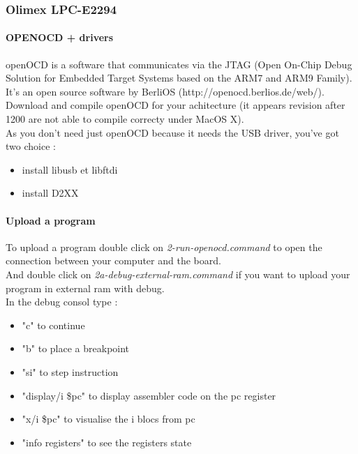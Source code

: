 
\subsubsection{Olimex LPC-E2294}

\paragraph{OPENOCD + drivers}
openOCD is a software that communicates via the JTAG (Open On-Chip Debug Solution for Embedded Target Systems based on the ARM7 and ARM9 Family). It's an open source software by BerliOS (http://openocd.berlios.de/web/). \\
Download and compile openOCD for your achitecture (it appears revision after 1200 are not able to compile correcty under MacOS X).\\
As you don't need just openOCD because it needs the USB driver, you've got two choice : 
\begin{itemize}
\item install libusb et libftdi
\item install D2XX
\end{itemize}

\paragraph{Upload a program}
To upload a program double click on \textit{2-run-openocd.command} to open the connection between your computer and the board.\\
And double click on \textit{2a-debug-external-ram.command} if you want to upload your program in external ram with debug.\\
In the debug consol type :
\begin{itemize}
\item "c" to continue
\item "b" to place a breakpoint
\item "si" to step instruction
\item "display/i \$pc" to display assembler code on the pc register
\item "x/i \$pc" to visualise the i blocs from pc
\item "info registers" to see the registers state
\end{itemize}

